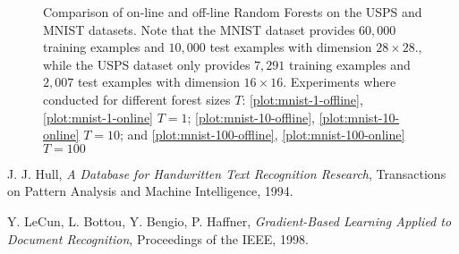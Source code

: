 \documentclass[11pt]{article}
\begin{document}
\begin{figure}[t]
{
	}
	\caption{Comparison of on-line and off-line Random Forests on the USPS \cite{Hull} and MNIST \cite{LeCunBottouBengioHaffner} datasets. Note that the MNIST dataset provides $60,000$ training examples and $10,000$ test examples with dimension $28 \times 28$., while the USPS dataset only provides $7,291$ training examples and $2,007$ test examples with dimension $16 \times 16$. Experiments where conducted for different forest sizes $T$: \ref{plot:mnist-1-offline}, \ref{plot:mnist-1-online} $T = 1$; \ref{plot:mnist-10-offline}, \ref{plot:mnist-10-online} $T = 10$; and \ref{plot:mnist-100-offline}, \ref{plot:mnist-100-online} $T = 100$}
	\label{fig:online-random-forests-experiments}
\end{figure}

\begin{thebibliography}{1}
	 J. J. Hull,
	 \emph{A Database for Handwritten Text Recognition Research},
	 Transactions on Pattern Analysis and Machine Intelligence,
	 1994.
	 
	 Y. LeCun,
	 L. Bottou,
	 Y. Bengio,
	 P. Haffner,
	 \emph{Gradient-Based Learning Applied to Document Recognition},
	 Proceedings of the IEEE,
	 1998.
\end{thebibliography}
\end{document}
